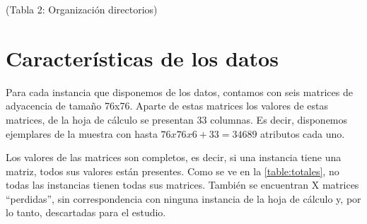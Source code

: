 (Tabla 2: Organización directorios)

\section{Características de los datos}
Para cada instancia que disponemos de los datos, contamos con seis matrices de adyacencia de tamaño 76x76. Aparte de estas matrices los valores de estas matrices, de la hoja de cálculo se presentan 33 columnas. Es decir, disponemos ejemplares de la muestra con hasta $76 x 76 x 6 + 33 = 34689$ atributos cada uno. 

Los valores de las matrices son completos, es decir, si una instancia tiene una matriz, todos sus valores están presentes. Como se ve en la \ref{table:totales}, no todas las instancias tienen todas sus matrices. También se encuentran X matrices ``perdidas'', sin correspondencia con ninguna instancia de la hoja de cálculo y, por lo tanto, descartadas para el estudio. 
